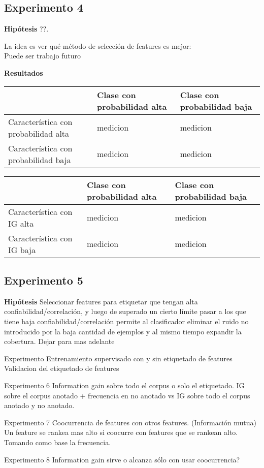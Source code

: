 \subsection{Experimento 4}
\textbf{Hipótesis} ??.

La idea es ver qué método de selección de features es mejor:\\

Puede ser trabajo futuro



\textbf{Resultados}\\

\begin{tabular}{||p{4cm} | l | l||}
\hline
 & Clase con probabilidad alta & Clase con probabilidad baja \\
\hline
Característica con probabilidad alta & medicion & medicion \\
\hline
Característica con probabilidad baja & medicion & medicion \\
\hline
\end{tabular}
\hfill
\begin{tabular}{||p{4cm} | l | l||}
\hline
 & Clase con probabilidad alta & Clase con probabilidad baja \\
\hline
Característica con IG alta & medicion & medicion \\
\hline
Característica con IG baja & medicion & medicion \\
\hline

\end{tabular}



\subsection{Experimento 5}
\textbf{Hipótesis} Seleccionar features para etiquetar que tengan alta confiabilidad/correlación, y luego de superado un cierto límite pasar a los que tiene baja confiabilidad/correlación permite al clasificador eliminar el ruido no introducido por la baja cantidad de ejemplos y al mismo tiempo expandir la cobertura.
Dejar para mas adelante


Experimento Entrenamiento supervisado con y sin etiquetado de  features
Validacion del etiquetado de features



Experimento 6
Information gain sobre todo el corpus o solo el etiquetado.
IG sobre el corpus anotado + frecuencia en no anotado vs IG sobre todo el corpus anotado y no anotado.


Experimento 7
Coocurrencia de features con otros features. (Información mutua)
Un feature se rankea mas alto si coocurre con features que se rankean alto. Tomando como base la frecuencia.

Experimento 8
Information gain sirve o alcanza sólo con usar coocurrencia?
